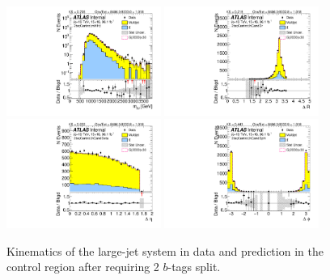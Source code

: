 \begin{figure}[htbp!]
\begin{center}
\includegraphics[width=0.45\textwidth,angle=-90]{figures/boosted/Control/b77_TwoTag_split_Control_mHH_l_1.pdf}
\includegraphics[width=0.45\textwidth,angle=-90]{figures/boosted/Control/b77_TwoTag_split_Control_hCandDr.pdf}\\
\includegraphics[width=0.45\textwidth,angle=-90]{figures/boosted/Control/b77_TwoTag_split_Control_hCandDeta.pdf}
\includegraphics[width=0.45\textwidth,angle=-90]{figures/boosted/Control/b77_TwoTag_split_Control_hCandDphi.pdf}
  \caption{Kinematics of the large-\R jet system in data and prediction in the control region after requiring 2 $b$-tags split.  }
  \label{fig:boosted-2bs-control-ak10-system}
\end{center}
\end{figure}

